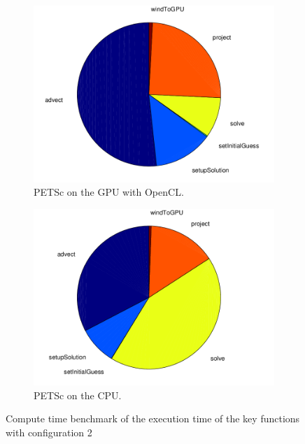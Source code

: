 \begin{figure}[ht]
	\center
	
	\begin{subfigure}{0.45\textwidth}
		\center
		\includegraphics[width=1.0\textwidth]{results/data/td/td_conf2_petsc_gpu}
		\caption{PETSc on the GPU with OpenCL.}
		\label{fig:td_conf2_petsc_gpu}
	\end{subfigure}
	\begin{subfigure}{0.45\textwidth}
		\center
		\includegraphics[width=1.0\textwidth]{results/data/td/td_conf2_petsc_cpu}
		\caption{PETSc on the CPU.}
		\label{fig:td_conf2_petsc_cpu}
	\end{subfigure}
	\caption{Compute time benchmark of the execution time of the key functions
			with configuration 2}
	\label{fig:td_conf2}
	
\end{figure}

